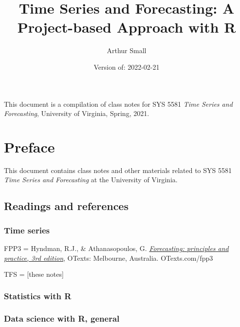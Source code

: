 \documentclass[
]{book}
\title{Time Series and Forecasting:
A Project-based Approach with R}
\author{Arthur Small}
\date{Version of: 2022-02-21}
\begin{document}
\maketitle

{
\setcounter{tocdepth}{1}
\tableofcontents
}
\hypertarget{section}{%
\chapter*{}\label{section}}

This document is a compilation of class notes for SYS 5581 \emph{Time Series and Forecasting}, University of Virginia, Spring, 2021.

\hypertarget{preface}{%
\chapter*{Preface}\label{preface}}

This document contains class notes and other materials related to SYS 5581 \emph{Time Series and Forecasting} at the University of Virginia.

\hypertarget{readings-and-references}{%
\section*{Readings and references}\label{readings-and-references}}

\hypertarget{time-series}{%
\subsection*{Time series}\label{time-series}}

FPP3 = Hyndman, R.J., \& Athanasopoulos, G. \citeyearpar{robjhyndmanForecastingPrinciplesPractice2021} \href{https://otexts.com/fpp3/}{\emph{Forecasting: principles and practice, 3rd edition}}, OTexts: Melbourne, Australia. OTexts.com/fpp3

TFS = {[}these notes{]}

\hypertarget{statistics-with-r}{%
\subsection*{Statistics with R}\label{statistics-with-r}}

\hypertarget{data-science-with-r-general}{%
\subsection*{Data science with R, general}\label{data-science-with-r-general}}
\end{document}
